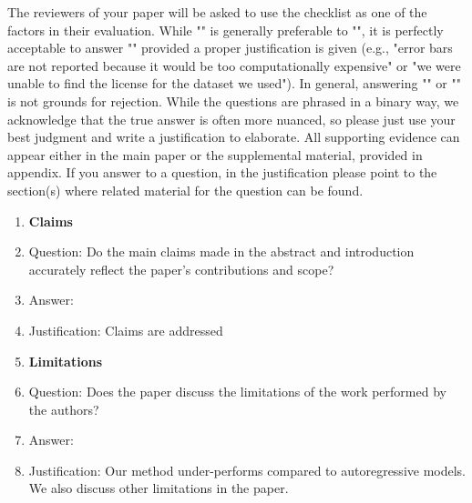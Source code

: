 \documentclass{article} %
\begin{document}
{\begin{appendices}
The reviewers of your paper will be asked to use the checklist as one of the factors in their evaluation. While "\answerYes{}" is generally preferable to "\answerNo{}", it is perfectly acceptable to answer "\answerNo{}" provided a proper justification is given (e.g., "error bars are not reported because it would be too computationally expensive" or "we were unable to find the license for the dataset we used"). In general, answering "\answerNo{}" or "\answerNA{}" is not grounds for rejection. While the questions are phrased in a binary way, we acknowledge that the true answer is often more nuanced, so please just use your best judgment and write a justification to elaborate. All supporting evidence can appear either in the main paper or the supplemental material, provided in appendix. If you answer \answerYes{} to a question, in the justification please point to the section(s) where related material for the question can be found.

 



\begin{enumerate}

\item {\bf Claims}
    \item[] Question: Do the main claims made in the abstract and introduction accurately reflect the paper's contributions and scope?
    \item[] Answer: \answerYes{} %
    \item[] Justification: Claims are addressed 

\item {\bf Limitations}
    \item[] Question: Does the paper discuss the limitations of the work performed by the authors?
    \item[] Answer: \answerYes{}%
    \item[] Justification: Our method under-performs compared to autoregressive models. We also discuss other limitations in the paper.


\end{enumerate}
\end{appendices}}
\end{document}
